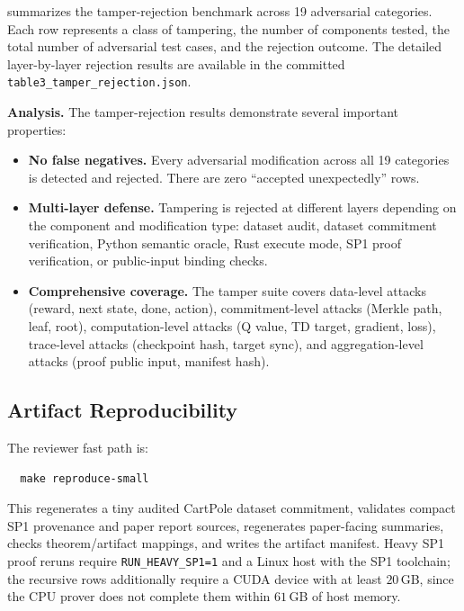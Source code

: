  summarizes the tamper-rejection benchmark across 19
adversarial categories. Each row represents a class of tampering, the number of
components tested, the total number of adversarial test cases, and the
rejection outcome. The detailed layer-by-layer rejection results are available
in the committed \texttt{table3\_tamper\_rejection.json}.



\textbf{Analysis.} The tamper-rejection results demonstrate several important
properties:

\begin{itemize}[leftmargin=1.5em]
  \item \textbf{No false negatives.} Every adversarial modification across all
  19 categories is detected and rejected. There are zero ``accepted
  unexpectedly'' rows.

  \item \textbf{Multi-layer defense.} Tampering is rejected at different
  layers depending on the component and modification type: dataset audit,
  dataset commitment verification, Python semantic oracle, Rust execute mode,
  SP1 proof verification, or public-input binding checks.

  \item \textbf{Comprehensive coverage.} The tamper suite covers
  data-level attacks (reward, next state, done, action), commitment-level
  attacks (Merkle path, leaf, root), computation-level attacks (Q value, TD
  target, gradient, loss), trace-level attacks (checkpoint hash, target sync),
  and aggregation-level attacks (proof public input, manifest hash).
\end{itemize}

\subsection{Artifact Reproducibility}

The reviewer fast path is:
\begin{verbatim}
  make reproduce-small
\end{verbatim}
This regenerates a tiny audited CartPole dataset commitment, validates compact
SP1 provenance and paper report sources, regenerates paper-facing summaries,
checks theorem/artifact mappings, and writes the artifact manifest. Heavy SP1
proof reruns require \texttt{RUN\_HEAVY\_SP1=1} and a Linux host with the SP1
toolchain; the recursive rows additionally require a CUDA device with at least
$20$\,GB, since the CPU prover does not complete them within $61$\,GB of host
memory.

